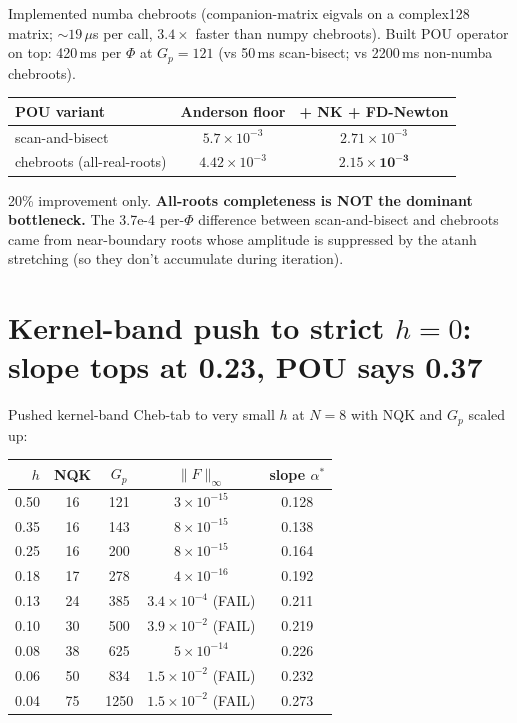 \documentclass[11pt]{article}
\begin{document}
Implemented numba chebroots (companion-matrix eigvals on a complex128
matrix; $\sim 19\,\mu$s per call, $3.4\times$ faster than numpy
chebroots). Built POU operator on top: 420\,ms per $\Phi$ at $G_p{=}121$
(vs 50\,ms scan-bisect; vs 2200\,ms non-numba chebroots).

\begin{center}
\begin{tabular}{lcc}
\toprule
POU variant & Anderson floor & + NK + FD-Newton \\
\midrule
scan-and-bisect & $5.7\!\times\!10^{-3}$ & $2.71\!\times\!10^{-3}$ \\
chebroots (all-real-roots) & $4.42\!\times\!10^{-3}$ & $\mathbf{2.15\!\times\!10^{-3}}$ \\
\bottomrule
\end{tabular}
\end{center}

20\% improvement only. \textbf{All-roots completeness is NOT the
dominant bottleneck.} The 3.7e-4 per-$\Phi$ difference between
scan-and-bisect and chebroots came from near-boundary roots whose
amplitude is suppressed by the atanh stretching (so they don't
accumulate during iteration).

\section{Kernel-band push to strict $h{=}0$: slope tops at 0.23, POU says 0.37}

Pushed kernel-band Cheb-tab to very small $h$ at $N{=}8$ with NQK and
$G_p$ scaled up:

\begin{center}
\begin{tabular}{rcccc}
\toprule
$h$ & NQK & $G_p$ & $\|F\|_\infty$ & slope $\alpha^*$ \\
\midrule
0.50 & 16 & 121  & $3\!\times\!10^{-15}$ & 0.128 \\
0.35 & 16 & 143  & $8\!\times\!10^{-15}$ & 0.138 \\
0.25 & 16 & 200  & $8\!\times\!10^{-15}$ & 0.164 \\
0.18 & 17 & 278  & $4\!\times\!10^{-16}$ & 0.192 \\
0.13 & 24 & 385  & $3.4\!\times\!10^{-4}$ (FAIL) & 0.211 \\
0.10 & 30 & 500  & $3.9\!\times\!10^{-2}$ (FAIL) & 0.219 \\
0.08 & 38 & 625  & $5\!\times\!10^{-14}$ & 0.226 \\
0.06 & 50 & 834  & $1.5\!\times\!10^{-2}$ (FAIL) & 0.232 \\
0.04 & 75 & 1250 & $1.5\!\times\!10^{-2}$ (FAIL) & 0.273 \\
\bottomrule
\end{tabular}
\end{center}
\end{document}
